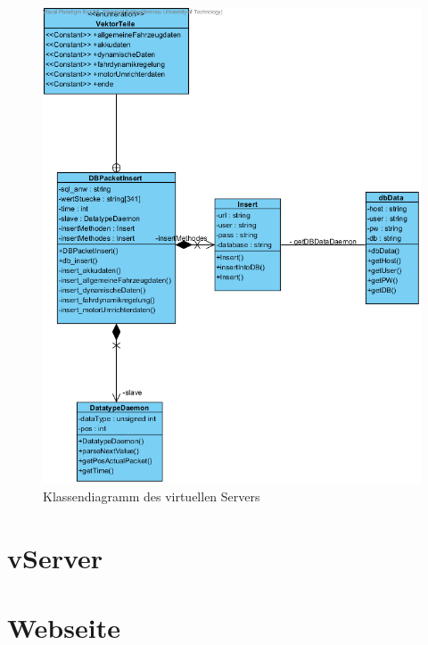 \documentclass[fontsize = 12pt, paper = a4]{scrreprt}
\begin{document}
\begin{figure}[h]
\centering
\includegraphics[scale = 0.9]{vServer}
\caption[Klassendiagramm des virtuellen Servers]{Klassendiagramm des virtuellen Servers}
\label{classvServer}
\end{figure} 











\section{vServer}




\section{Webseite}
\end{document}
